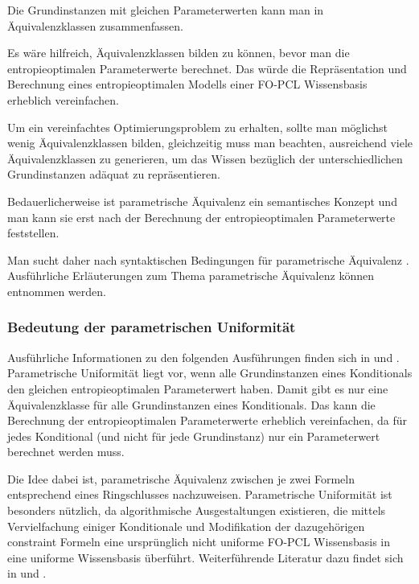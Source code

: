 \documentclass[a4paper, 11pt]{book}
\begin{document}
Die Grundinstanzen mit gleichen Parameterwerten kann man in Äquivalenzklassen  zusammenfassen. 

Es wäre hilfreich, Äquivalenzklassen bilden zu können, bevor man die entropieoptimalen Parameterwerte berechnet. Das würde die Repräsentation und Berechnung eines entropieoptimalen Modells einer FO-PCL Wissensbasis  erheblich vereinfachen.

Um ein vereinfachtes Optimierungsproblem zu erhalten, sollte man möglichst wenig Äquivalenzklassen  bilden, gleichzeitig muss man beachten, ausreichend viele Äquivalenzklassen  zu generieren, um das Wissen bezüglich der unterschiedlichen Grundinstanzen adäquat zu repräsentieren.

Bedauerlicherweise ist parametrische Äquivalenz  ein semantisches Konzept und man kann sie erst nach der Berechnung der entropieoptimalen Parameterwerte feststellen.

Man sucht daher nach syntaktischen Bedingungen für parametrische Äquivalenz . Ausführliche Erläuterungen zum Thema parametrische Äquivalenz können \cite[Kap. 7.1, S. 148ff]{Fis10} entnommen werden.

\subsubsection{Bedeutung der parametrischen Uniformität} 
Ausführliche Informationen zu den folgenden Ausführungen finden sich in \cite[Kap. 7.1.1 und 7.1.2, S. 151-153]{Fis10} und \cite{BHM14}.
Parametrische Uniformität liegt vor, wenn alle Grundinstanzen eines Konditionals den gleichen entropieoptimalen Parameterwert haben. Damit gibt es nur eine Äquivalenzklasse für alle Grundinstanzen eines Konditionals. Das kann die Berechnung der entropieoptimalen Parameterwerte erheblich vereinfachen, da für jedes Konditional (und nicht für jede Grundinstanz) nur ein Parameterwert berechnet werden muss. 

Die Idee dabei ist, parametrische Äquivalenz zwischen je zwei Formeln entsprechend eines Ringschlusses nachzuweisen.
Parametrische Uniformität ist besonders nützlich, da algorithmische Ausgestaltungen existieren, die mittels Vervielfachung einiger Konditionale und Modifikation der dazugehörigen constraint Formeln eine ursprünglich nicht uniforme FO-PCL Wissensbasis  in eine uniforme Wissensbasis überführt. Weiterführende Literatur dazu findet sich in \cite[Kap. 5, S.71ff]{BJ11} und \cite{BK15}.
\end{document}
